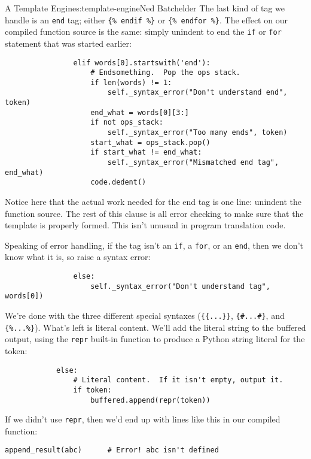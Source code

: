 \begin{aosachapter}{A Template Engine}{s:template-engine}{Ned Batchelder}
The last kind of tag we handle is an \texttt{end} tag; either
\texttt{\{\% endif \%\}} or \texttt{\{\% endfor \%\}}. The effect on our
compiled function source is the same: simply unindent to end the
\texttt{if} or \texttt{for} statement that was started earlier:

\begin{verbatim}
                elif words[0].startswith('end'):
                    # Endsomething.  Pop the ops stack.
                    if len(words) != 1:
                        self._syntax_error("Don't understand end", token)
                    end_what = words[0][3:]
                    if not ops_stack:
                        self._syntax_error("Too many ends", token)
                    start_what = ops_stack.pop()
                    if start_what != end_what:
                        self._syntax_error("Mismatched end tag", end_what)
                    code.dedent()
\end{verbatim}

Notice here that the actual work needed for the end tag is one line:
unindent the function source. The rest of this clause is all error
checking to make sure that the template is properly formed. This isn't
unusual in program translation code.

Speaking of error handling, if the tag isn't an \texttt{if}, a
\texttt{for}, or an \texttt{end}, then we don't know what it is, so
raise a syntax error:

\begin{verbatim}
                else:
                    self._syntax_error("Don't understand tag", words[0])
\end{verbatim}

We're done with the three different special syntaxes
(\texttt{\{\{...\}\}}, \texttt{\{\#...\#\}}, and \texttt{\{\%...\%\}}).
What's left is literal content. We'll add the literal string to the
buffered output, using the \texttt{repr} built-in function to produce a
Python string literal for the token:

\begin{verbatim}
            else:
                # Literal content.  If it isn't empty, output it.
                if token:
                    buffered.append(repr(token))
\end{verbatim}

If we didn't use \texttt{repr}, then we'd end up with lines like this in
our compiled function:

\begin{verbatim}
append_result(abc)      # Error! abc isn't defined
\end{verbatim}


\end{aosachapter}
